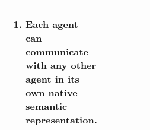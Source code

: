 \begin{xltabular}[l]{\linewidth}{@{} >{\small\raggedright\arraybackslash}p{0.47\linewidth} >{\small\raggedright\arraybackslash}X @{}}
\begin{enumerate}[left=10pt, nosep]
  \item Each agent can communicate with any other agent in its own native semantic representation.
\end{enumerate}\\
%
\bottomrule
\end{xltabular}
